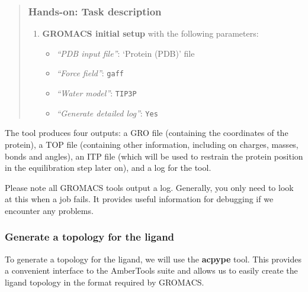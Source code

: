 \documentclass[twocolumn]{bmcart}%
\providecommand{\tightlist}{%
  \setlength{\itemsep}{0pt}\setlength{\parskip}{0pt}}
\providecommand{\tightlist}{%
  \setlength{\itemsep}{0pt}\setlength{\parskip}{0pt}}
\begin{document}
\begin{quote}
\subsubsection{Hands-on: Task
description}\label{hands-on-task-description-1}

\begin{enumerate}
\def\labelenumi{\arabic{enumi}.}
\tightlist
\item
  \textbf{GROMACS initial setup} with the following parameters:

  \begin{itemize}
  \tightlist
  \item
    \emph{``PDB input file''}: `Protein (PDB)' file
  \item
    \emph{``Force field''}: \texttt{gaff}
  \item
    \emph{``Water model''}: \texttt{TIP3P}
  \item
    \emph{``Generate detailed log''}: \texttt{Yes}
  \end{itemize}
\end{enumerate}


\end{quote}

The tool produces four outputs: a GRO file (containing the coordinates
of the protein), a TOP file (containing other information, including on
charges, masses, bonds and angles), an ITP file (which will be used to
restrain the protein position in the equilibration step later on), and a
log for the tool.

Please note all GROMACS tools output a log. Generally, you only need to
look at this when a job fails. It provides useful information for
debugging if we encounter any problems.

\subsubsection{Generate a topology for the
ligand}\label{generate-a-topology-for-the-ligand}

To generate a topology for the ligand, we will use the \textbf{acpype}
tool. This provides a convenient interface to the AmberTools suite and
allows us to easily create the ligand topology in the format required by
GROMACS.
\end{document}
